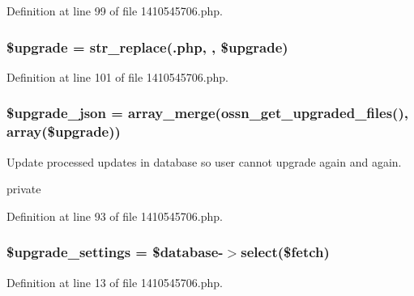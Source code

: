 Definition at line 99 of file 1410545706.\+php.

\subsubsection[{\texorpdfstring{\$upgrade}{$upgrade}}]{\setlength{\rightskip}{0pt plus 5cm}\$upgrade = str\+\_\+replace(\textquotesingle{}.php\textquotesingle{}, \textquotesingle{}\textquotesingle{}, \$upgrade)}\hypertarget{1410545706_8php_a9084097ce600d3cc7a79a20ecaea9906}{}\label{1410545706_8php_a9084097ce600d3cc7a79a20ecaea9906}


Definition at line 101 of file 1410545706.\+php.

\subsubsection[{\texorpdfstring{\$upgrade\+\_\+json}{$upgrade_json}}]{\setlength{\rightskip}{0pt plus 5cm}\$upgrade\+\_\+json = array\+\_\+merge({\bf ossn\+\_\+get\+\_\+upgraded\+\_\+files}(), array(\$upgrade))}\hypertarget{1410545706_8php_a512525d0f5eb608ac72ca7b85e5fbf65}{}\label{1410545706_8php_a512525d0f5eb608ac72ca7b85e5fbf65}
Update processed updates in database so user cannot upgrade again and again.

private 

Definition at line 93 of file 1410545706.\+php.

\subsubsection[{\texorpdfstring{\$upgrade\+\_\+settings}{$upgrade_settings}}]{\setlength{\rightskip}{0pt plus 5cm}\$upgrade\+\_\+settings = \${\bf database}-\/$>$select(\$fetch)}\hypertarget{1410545706_8php_ad6ac3063be110b760bc79cfecd54cb1a}{}\label{1410545706_8php_ad6ac3063be110b760bc79cfecd54cb1a}


Definition at line 13 of file 1410545706.\+php.

